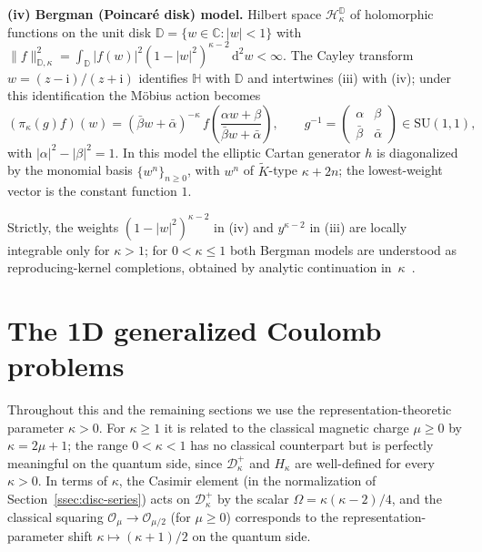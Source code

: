 \documentclass[11pt]{article}
\theoremstyle{plain}
\theoremstyle{definition}
\theoremstyle{remark}
\newcommand{\C}{\mathbb{C}}
\newcommand{\HH}{\mathbb{H}}
\newcommand{\SU}{\mathrm{SU}}
\newcommand{\Kt}{\widetilde{K}}
\newcommand{\OO}{\mathcal{O}}
\newcommand{\D}{\mathcal{D}}
\newcommand{\DD}{\mathbb{D}}
\newcommand{\Hil}{\mathcal{H}}
\newcommand{\ii}{\mathrm{i}}
\begin{document}
\medskip\noindent\textbf{(iv) Bergman (Poincar\'e disk) model.}
Hilbert space $\Hil^{\DD}_{\kappa}$ of holomorphic functions on the unit disk
$\DD=\{w\in\C:|w|<1\}$ with
$\|f\|^{2}_{\DD,\kappa}=\int_{\DD}|f(w)|^{2}(1-|w|^{2})^{\kappa-2}\,\mathrm{d}^{2}w<\infty$.
The Cayley transform $w=(z-\ii)/(z+\ii)$ identifies $\HH$ with $\DD$ and intertwines
(iii) with (iv); under this identification the M\"obius action becomes
\[
  (\pi_{\kappa}(g)f)(w)=(\bar\beta w+\bar\alpha)^{-\kappa}\,
  f\!\left(\frac{\alpha w+\beta}{\bar\beta w+\bar\alpha}\right),\qquad
  g^{-1}=\begin{pmatrix}\alpha&\beta\\\bar\beta&\bar\alpha\end{pmatrix}\in\SU(1,1),
\]
with $|\alpha|^{2}-|\beta|^{2}=1$. In this model the elliptic Cartan generator $h$
is diagonalized by the monomial basis $\{w^{n}\}_{n\ge 0}$, with $w^{n}$ of
$\Kt$-type $\kappa+2n$; the lowest-weight vector is the constant function $1$.

Strictly, the weights $(1-|w|^{2})^{\kappa-2}$ in (iv) and $y^{\kappa-2}$ in (iii)
are locally integrable only for $\kappa>1$; for $0<\kappa\le 1$ both Bergman models
are understood as reproducing-kernel completions, obtained by analytic
continuation in~$\kappa$~\cite{Sally1967}.

\section{The 1D generalized Coulomb problems}\label{sec:Hkappa}

Throughout this and the remaining sections we use the
representation-theoretic parameter $\kappa>0$. For $\kappa\ge 1$ it is
related to the classical magnetic charge $\mu\ge 0$ by
$\kappa=2\mu+1$; the range $0<\kappa<1$ has no classical counterpart
but is perfectly meaningful on the quantum side, since $\D^{+}_{\kappa}$
and $H_{\kappa}$ are well-defined for every $\kappa>0$.
In terms of $\kappa$, the Casimir element (in the normalization of Section~\ref{ssec:disc-series}) acts on $\D^{+}_{\kappa}$
by the scalar $\Omega=\kappa(\kappa-2)/4$,
and the classical squaring $\OO_{\mu}\to\OO_{\mu/2}$ (for $\mu\ge 0$)
corresponds to the representation-parameter shift
$\kappa\mapsto(\kappa+1)/2$ on the quantum side.
\end{document}
